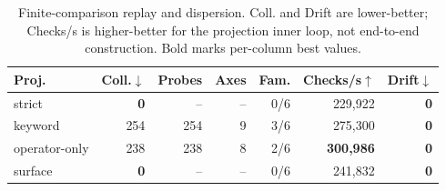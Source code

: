 \begin{table}[t]
\centering
\footnotesize
\caption{Finite-comparison replay and dispersion. Coll. and Drift are lower-better; Checks/s is higher-better for the projection inner loop, not end-to-end construction. Bold marks per-column best values.}
\label{tab:scalability-family}
\setlength{\tabcolsep}{2.5pt}
\begin{tabular}{@{}lrrrrrr@{}}
\toprule
Proj. & Coll.$\downarrow$ & Probes & Axes & Fam. & Checks/s$\uparrow$ & Drift$\downarrow$ \\
\midrule
strict & \textbf{0} & -- & -- & 0/6 & 229,922 & \textbf{0} \\
keyword & 254 & 254 & 9 & 3/6 & 275,300 & \textbf{0} \\
operator-only & 238 & 238 & 8 & 2/6 & \textbf{300,986} & \textbf{0} \\
surface & \textbf{0} & -- & -- & 0/6 & 241,832 & \textbf{0} \\
\bottomrule
\end{tabular}
\end{table}
